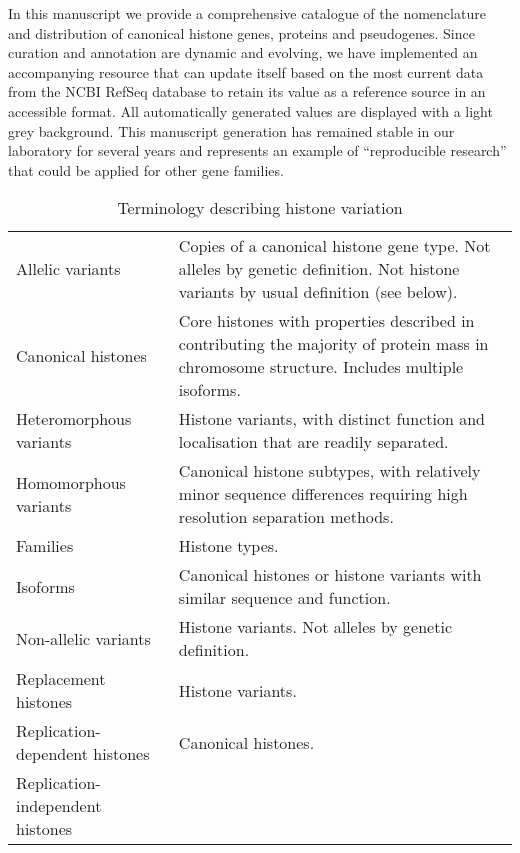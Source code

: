   In this manuscript we provide a comprehensive catalogue of the nomenclature and distribution 
  of canonical histone genes, proteins and pseudogenes. 
  Since curation and annotation are dynamic and evolving, we have implemented an accompanying resource 
  that can update itself based on the most current data from the NCBI RefSeq database 
  to retain its value as a reference source in an accessible format.
  All automatically generated values are displayed with a light grey background.
  This manuscript generation has remained stable in our laboratory for several years
  and represents an example of ``reproducible research'' 
  that could be applied for other gene families.

  \begin{table*}
    \caption{Terminology describing histone variation}
    \label{tab:histone-divisions}
    \centering
    \begin{tabular}{F p{\dimexpr(\textwidth--4\tabcolsep)}}
      \toprule
	  Allelic variants &
	  Copies of a canonical histone gene type.
	  Not alleles by genetic definition. 
	  Not histone variants by usual definition (see below). \\
      \addlinespace
	  Canonical histones &
	  Core histones with properties described in  
	  contributing the majority of protein mass in chromosome structure. 
	  Includes multiple isoforms.
	  \\
      \addlinespace
	  Heteromorphous variants &
	  Histone variants, 
	  with distinct function and localisation that are readily separated. \\
      \addlinespace
	  Homomorphous variants &
	  Canonical histone subtypes,
	  with relatively minor sequence differences requiring high resolution separation methods. \\
      \addlinespace
	  Families &
	  Histone types. \\
      \addlinespace
	  Isoforms &
	  Canonical histones or histone variants with similar sequence and function. \\
      \addlinespace
	  Non-allelic variants &
	  Histone variants.
	  Not alleles by genetic definition. \\
      \addlinespace
      Replacement histones &
	  Histone variants. \\
      \addlinespace
	  Replication-dependent histones &
	  Canonical histones. \\
      \addlinespace
	  Replication-independent histones &

\end{tabular}
\end{table*}
